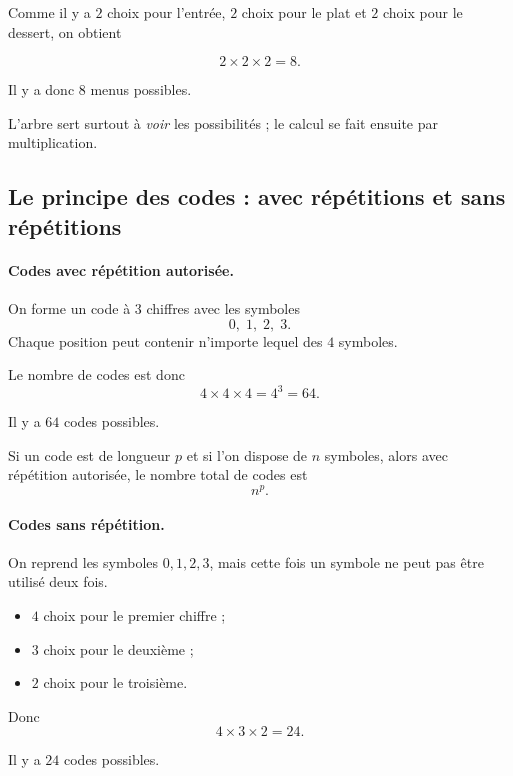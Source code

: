 \documentclass[11pt]{article}
\begin{document}
\begin{solution}
Comme il y a \(2\) choix pour l’entrée, \(2\) choix pour le plat et \(2\) choix pour le dessert,
on obtient

\[
2\times 2\times 2=8.
\]

Il y a donc \(\boxed{8}\) menus possibles.
\end{solution}

\begin{remarque}
L’arbre sert surtout à \emph{voir} les possibilités ; le calcul se fait ensuite par multiplication.
\end{remarque}

\subsection{Le principe des codes : avec répétitions et sans répétitions}\label{sec:principe-des-codes}

\paragraph{Codes avec répétition autorisée.}
\begin{exemple}
On forme un code à \(3\) chiffres avec les symboles
\[
0,\;1,\;2,\;3.
\]
Chaque position peut contenir n’importe lequel des \(4\) symboles.

Le nombre de codes est donc
\[
4\times 4\times 4=4^3=64.
\]

Il y a \(\boxed{64}\) codes possibles.
\end{exemple}

\begin{proposition}[Généralisation]\label{prop:codes-avec-repetition}
Si un code est de longueur \(p\) et si l’on dispose de \(n\) symboles, alors avec répétition autorisée,
le nombre total de codes est
\[
\boxed{n^p}.
\]
\end{proposition}

\paragraph{Codes sans répétition.}
\begin{exemple}
On reprend les symboles \(0,1,2,3\), mais cette fois un symbole ne peut pas être utilisé deux fois.

\begin{itemize}
    \item \(4\) choix pour le premier chiffre ;
    \item \(3\) choix pour le deuxième ;
    \item \(2\) choix pour le troisième.
\end{itemize}

Donc
\[
4\times 3\times 2=24.
\]

Il y a \(\boxed{24}\) codes possibles.
\end{exemple}
\end{document}

